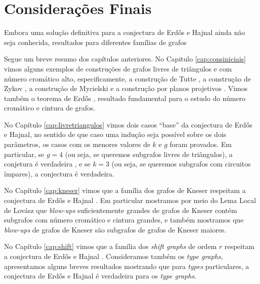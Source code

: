 \chapter{Considerações Finais}
\label{cap:consfinais}




Embora uma solução definitiva para a conjectura de Erd\H{o}s e Hajnal ainda não seja conhecida, resultados para diferentes famílias de grafos


Segue um breve resumo dos capítulos anteriores. No Capitulo \ref{cap:consiniciais} vimos alguns exemplos de construções de grafos livres de triângulos e com número cromático alto, especificamente, a construção de Tutte \cite{descartes1947three}, a construção de Zykov \cite{zykov1949some}, a construção de Mycielski \cite{mycielski1955coloriage} e a construção por planos projetivos \cite{codenotti2000some}. Vimos também o teorema de Erd\H{o}s \cite{erdos1959graph}, resultado fundamental para o estudo do número cromático e cintura de grafos.

No Capítulo \ref{cap:livretriangulos} vimos dois casos ``base'' da conjectura de Erd\H{o}s e Hajnal, no sentido de que caso uma indução seja possível sobre os dois parâmetros, os casos com os menores valores de $k$ e $g$ foram provados. Em particular, se $g=4$ (ou seja, se queremos subgrafos livres de triângulos), a conjetura é verdadeira \cite{rodl1977chromatic}, e se $k=3$ (ou seja, se queremos subgrafos com circuitos ímpares), a conjectura é verdadeira.

No Capítulo \ref{cap:kneser} vimos que a família dos grafos de Kneser respeitam a conjectura de Erd\H{o}s e Hajnal \cite{mohar2015triangle}. Em particular mostramos por meio do Lema Local de Lovász que \textit{blow-ups} suficientemente grandes de grafos de Kneser contém subgrafos com número cromático e cintura grandes, e também mostramos que \textit{blow-ups} de grafos de Kneser são subgrafos de grafos de Kneser maiores.

No Capítulo \ref{cap:shift} vimos que a família dos \textit{shift graphs} de ordem $r$ respeitam a conjectura de Erd\H{o}s e Hajnal \cite{gabor2018cepa}. Consideramos também os \textit{type graphs}, apresentamos alguns breves resultados mostrando que para \textit{types} particulares, a conjectura de Erd\H{o}s e Hajnal é verdadeira para os \textit{type graphs}.


